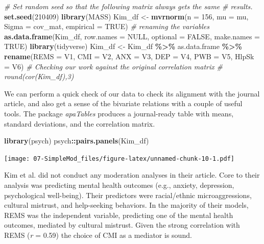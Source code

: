 \documentclass[
  11pt,
]{book}
\newenvironment{Shaded}{\begin{snugshade}}{\end{snugshade}}
\newcommand{\AttributeTok}[1]{\textcolor[rgb]{0.27,0.27,0.27}{#1}}
\newcommand{\CommentTok}[1]{\textcolor[rgb]{0.37,0.37,0.37}{\textit{#1}}}
\newcommand{\ConstantTok}[1]{\textcolor[rgb]{0.37,0.37,0.37}{#1}}
\newcommand{\DecValTok}[1]{\textcolor[rgb]{0.06,0.06,0.06}{#1}}
\newcommand{\FunctionTok}[1]{\textcolor[rgb]{0.27,0.27,0.27}{\textbf{#1}}}
\newcommand{\NormalTok}[1]{#1}
\newcommand{\OtherTok}[1]{\textcolor[rgb]{0.37,0.37,0.37}{#1}}
\newcommand{\SpecialCharTok}[1]{\textcolor[rgb]{0.43,0.43,0.43}{\textbf{#1}}}
\begin{document}
\begin{Shaded}
\begin{Highlighting}[]
\CommentTok{\# Set random seed so that the following matrix always gets the same}
\CommentTok{\# results.}
\FunctionTok{set.seed}\NormalTok{(}\DecValTok{210409}\NormalTok{)}
\FunctionTok{library}\NormalTok{(MASS)}
\NormalTok{Kim\_df }\OtherTok{\textless{}{-}} \FunctionTok{mvrnorm}\NormalTok{(}\AttributeTok{n =} \DecValTok{156}\NormalTok{, }\AttributeTok{mu =}\NormalTok{ mu, }\AttributeTok{Sigma =}\NormalTok{ cov\_mat, }\AttributeTok{empirical =} \ConstantTok{TRUE}\NormalTok{)}
\CommentTok{\# renaming the variables}
\FunctionTok{as.data.frame}\NormalTok{(Kim\_df, }\AttributeTok{row.names =} \ConstantTok{NULL}\NormalTok{, }\AttributeTok{optional =} \ConstantTok{FALSE}\NormalTok{, }\AttributeTok{make.names =} \ConstantTok{TRUE}\NormalTok{)}
\FunctionTok{library}\NormalTok{(tidyverse)}
\NormalTok{Kim\_df }\OtherTok{\textless{}{-}}\NormalTok{ Kim\_df }\SpecialCharTok{\%\textgreater{}\%}
\NormalTok{    as.data.frame }\SpecialCharTok{\%\textgreater{}\%}
    \FunctionTok{rename}\NormalTok{(}\AttributeTok{REMS =}\NormalTok{ V1, }\AttributeTok{CMI =}\NormalTok{ V2, }\AttributeTok{ANX =}\NormalTok{ V3, }\AttributeTok{DEP =}\NormalTok{ V4, }\AttributeTok{PWB =}\NormalTok{ V5, }\AttributeTok{HlpSk =}\NormalTok{ V6)}
\CommentTok{\# Checking our work against the original correlation matrix}
\CommentTok{\# round(cor(Kim\_df),3)}
\end{Highlighting}
\end{Shaded}

We can perform a quick check of our data to check its alignment with the journal article, and also get a sense of the bivariate relations with a couple of useful tools. The package \emph{apaTables} produces a journal-ready table with means, standard deviations, and the correlation matrix.

\begin{Shaded}
\begin{Highlighting}[]
\FunctionTok{library}\NormalTok{(psych)}
\NormalTok{psych}\SpecialCharTok{::}\FunctionTok{pairs.panels}\NormalTok{(Kim\_df)}
\end{Highlighting}
\end{Shaded}

\texttt{[image: 07-SimpleMod\_files/figure-latex/unnamed-chunk-10-1.pdf]}

Kim et al. \citeyearpar{kim_racial_2017} did not conduct any moderation analyses in their article. Core to their analysis was predicting mental health outcomes (e.g., anxiety, depression, psychological well-being). Their predictors were racial/ethnic microaggressions, cultural mistrust, and help-seeking behaviors. In the majority of their models, REMS was the independent variable, predicting one of the mental health outcomes, mediated by cultural mistrust. Given the strong correlation with REMS (\emph{r} = 0.59) the choice of CMI as a mediator is sound.
\end{document}

